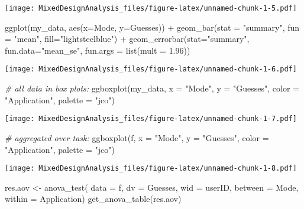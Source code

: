 \documentclass[
]{article}
\newenvironment{Shaded}{\begin{snugshade}}{\end{snugshade}}
\newcommand{\AttributeTok}[1]{\textcolor[rgb]{0.77,0.63,0.00}{#1}}
\newcommand{\CommentTok}[1]{\textcolor[rgb]{0.56,0.35,0.01}{\textit{#1}}}
\newcommand{\FloatTok}[1]{\textcolor[rgb]{0.00,0.00,0.81}{#1}}
\newcommand{\FunctionTok}[1]{\textcolor[rgb]{0.00,0.00,0.00}{#1}}
\newcommand{\NormalTok}[1]{#1}
\newcommand{\OtherTok}[1]{\textcolor[rgb]{0.56,0.35,0.01}{#1}}
\newcommand{\SpecialCharTok}[1]{\textcolor[rgb]{0.00,0.00,0.00}{#1}}
\newcommand{\StringTok}[1]{\textcolor[rgb]{0.31,0.60,0.02}{#1}}
\begin{document}
\texttt{[image: MixedDesignAnalysis\_files/figure-latex/unnamed-chunk-1-5.pdf]}

\begin{Shaded}
\begin{Highlighting}[]
\FunctionTok{ggplot}\NormalTok{(my\_data, }\FunctionTok{aes}\NormalTok{(}\AttributeTok{x=}\NormalTok{Mode, }\AttributeTok{y=}\NormalTok{Guesses)) }\SpecialCharTok{+} \FunctionTok{geom\_bar}\NormalTok{(}\AttributeTok{stat =} \StringTok{"summary"}\NormalTok{, }\AttributeTok{fun =} \StringTok{"mean"}\NormalTok{, }\AttributeTok{fill=}\StringTok{"lightsteelblue"}\NormalTok{) }\SpecialCharTok{+} \FunctionTok{geom\_errorbar}\NormalTok{(}\AttributeTok{stat=}\StringTok{"summary"}\NormalTok{, }\AttributeTok{fun.data=}\StringTok{"mean\_se"}\NormalTok{, }\AttributeTok{fun.args =} \FunctionTok{list}\NormalTok{(}\AttributeTok{mult =} \FloatTok{1.96}\NormalTok{))}
\end{Highlighting}
\end{Shaded}

\texttt{[image: MixedDesignAnalysis\_files/figure-latex/unnamed-chunk-1-6.pdf]}

\begin{Shaded}
\begin{Highlighting}[]
\CommentTok{\# all data in box plots: }
\FunctionTok{ggboxplot}\NormalTok{(my\_data, }\AttributeTok{x =} \StringTok{"Mode"}\NormalTok{, }\AttributeTok{y =} \StringTok{"Guesses"}\NormalTok{, }\AttributeTok{color =} \StringTok{"Application"}\NormalTok{, }\AttributeTok{palette =} \StringTok{"jco"}\NormalTok{)}
\end{Highlighting}
\end{Shaded}

\texttt{[image: MixedDesignAnalysis\_files/figure-latex/unnamed-chunk-1-7.pdf]}

\begin{Shaded}
\begin{Highlighting}[]
\CommentTok{\# aggregated over task: }
\FunctionTok{ggboxplot}\NormalTok{(f, }\AttributeTok{x =} \StringTok{"Mode"}\NormalTok{, }\AttributeTok{y =} \StringTok{"Guesses"}\NormalTok{, }\AttributeTok{color =} \StringTok{"Application"}\NormalTok{, }\AttributeTok{palette =} \StringTok{"jco"}\NormalTok{)}
\end{Highlighting}
\end{Shaded}

\texttt{[image: MixedDesignAnalysis\_files/figure-latex/unnamed-chunk-1-8.pdf]}

\begin{Shaded}
\begin{Highlighting}[]
\NormalTok{res.aov }\OtherTok{\textless{}{-}} \FunctionTok{anova\_test}\NormalTok{( }\AttributeTok{data =}\NormalTok{ f, }\AttributeTok{dv =}\NormalTok{ Guesses, }\AttributeTok{wid =}\NormalTok{ userID, }\AttributeTok{between =}\NormalTok{ Mode, }\AttributeTok{within =}\NormalTok{ Application)}
\FunctionTok{get\_anova\_table}\NormalTok{(res.aov)}
\end{Highlighting}
\end{Shaded}
\end{document}
